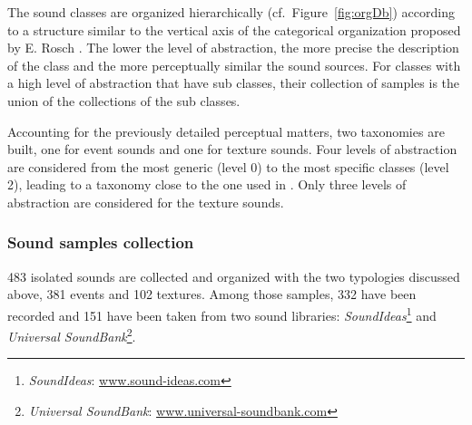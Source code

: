 \documentclass[12pt]{elsarticle}
\newcommand{\cf}{cf.}
\begin{document}
The sound classes are organized hierarchically (\cf~Figure~\ref{fig:orgDb}) according to a structure similar to the vertical axis of the categorical organization proposed by E. Rosch \cite{rosch1978cognition}. The lower the level of abstraction, the more precise the description of the class and the more perceptually similar the sound sources. For classes with a high level of abstraction that have sub classes, their collection of samples is the union of the collections of the sub classes.


Accounting for the previously detailed perceptual matters, two taxonomies are built, one for event sounds and one for texture sounds. Four levels of abstraction are considered from the most generic (level 0) to the most specific classes (level 2), leading to a taxonomy close to the one used in \cite{Salamon14}. Only three levels of abstraction are considered for the texture sounds.

\subsubsection*{Sound samples collection}


483 isolated sounds are collected and organized with the two typologies discussed above, 381 events and 102 textures. Among those samples, 332 have been recorded and 151 have been taken from two sound libraries: \emph{SoundIdeas}\footnote{\emph{SoundIdeas}: \url{www.sound-ideas.com}} and \emph{Universal SoundBank}\footnote{\emph{Universal SoundBank}: \url{www.universal-soundbank.com}}.
\end{document}
